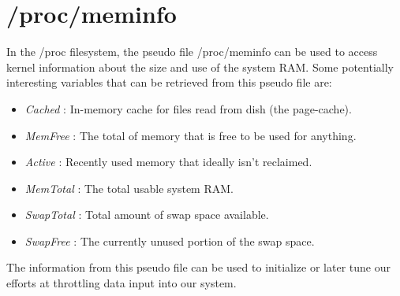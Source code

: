 \section{/proc/meminfo}
In the /proc filesystem, the pseudo file /proc/meminfo can be used to access kernel information about the size and use of the system RAM. Some potentially interesting variables that can be retrieved from this pseudo file are:
\begin{itemize}
\item \emph{Cached} : In-memory cache for files read from dish (the page-cache).
\item \emph{MemFree} : The total of memory that is free to be used for anything.
\item \emph{Active} : Recently used memory that ideally isn't reclaimed.
\item \emph{MemTotal} : The total usable system RAM.
\item \emph{SwapTotal} : Total amount of swap space available.
\item \emph{SwapFree} : The currently unused portion of the swap space.
\end{itemize}
The information from this pseudo file can be used to initialize or later tune our efforts at throttling data input into our system. 
